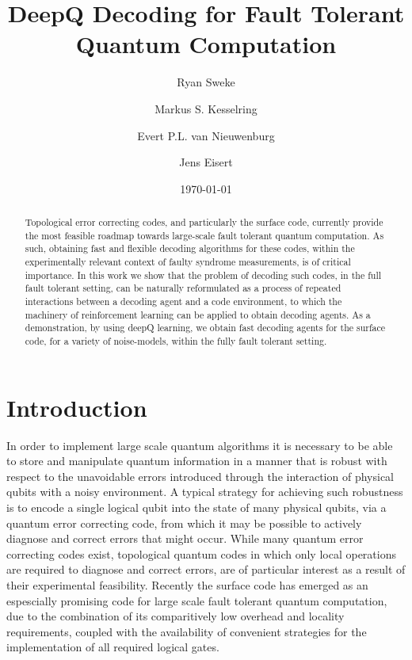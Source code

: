 \documentclass[onecolumn,preprintnumbers,amsmath,amssymb,notitlepage,nofootinbib,longbibliography,superscriptaddress]{revtex4-1}
\begin{document}
\title{DeepQ Decoding for Fault Tolerant Quantum Computation}

\author{Ryan Sweke}
\author{Markus S. Kesselring}
\author{Evert P.L. van Nieuwenburg}
\author{Jens Eisert}


\date{\today}


\begin{abstract}
Topological error correcting codes, and particularly the surface code, currently provide the most feasible roadmap towards large-scale fault tolerant quantum computation. As such, obtaining fast and flexible decoding algorithms for these codes, within the experimentally relevant context of faulty syndrome measurements, is of critical importance. In this work we show that the problem of decoding such codes, in the full fault tolerant setting, can be naturally reformulated as a process of repeated interactions between a decoding agent and a code environment, to which the machinery of reinforcement learning can be applied to obtain decoding agents. As a demonstration, by using deepQ learning, we obtain fast decoding agents for the surface code, for a variety of noise-models, within the fully fault tolerant setting.
\end{abstract}

\maketitle
 
 
\section{Introduction}\label{s:introduction}

    In order to implement large scale quantum algorithms it is necessary to be able to store and manipulate quantum information in a manner that is robust with respect to the unavoidable errors introduced through the interaction of physical qubits with a noisy environment. A typical strategy for achieving such robustness is to encode a single logical qubit into the state of many physical qubits, via a quantum error correcting code, from which it may be possible to actively diagnose and correct errors that might occur. While many quantum error correcting codes exist, topological quantum codes in which only local operations are required to diagnose and correct errors, are of particular interest as a result of their experimental feasibility. Recently the surface code has emerged as an espescially promising code for large scale fault tolerant quantum computation, due to the combination of its comparitively low overhead and locality requirements, coupled with the availability of convenient strategies for the implementation of all required logical gates.
\end{document}
